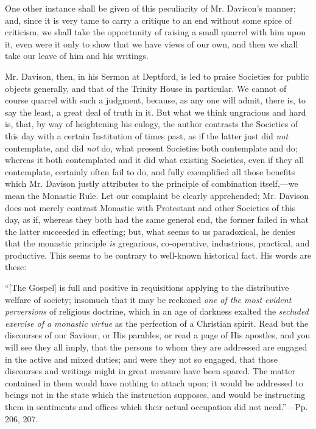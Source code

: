 One other instance shall be given of this
peculiarity of Mr. Davison's manner; and, since it is very tame to
carry a critique to an end without some spice of criticism, we shall
take the opportunity of raising a small quarrel with him upon it, even
were it only to show that we have views of our own, and then we shall
take our leave of him and his writings.

Mr. Davison, then, in his Sermon at Deptford, is
led to praise Societies for public objects generally, and that of the Trinity House in particular. We cannot of course quarrel with
such a judgment, because, as any one will admit, there is, to say the
least, a great deal of truth in it. But what we think ungracious and
hard is, that, by way of heightening his eulogy, the author contrasts
the Societies of this day with a certain Institution of times past, as
if the latter just did \emph{not} contemplate, and did \emph{not} do,
what present Societies both contemplate and do; whereas it both
contemplated and it did what existing Societies, even if they all
contemplate, certainly often fail to do, and fully exemplified all
those benefits which Mr. Davison justly attributes to the principle of
combination itself,—we mean the Monastic Rule. Let our complaint be
clearly apprehended; Mr. Davison does not merely contrast Monastic
with Protestant and other Societies of this day, as if, whereas they
both had the same general end, the former failed in what the latter
succeeded in effecting; but, what seems to us paradoxical, he denies
that the monastic principle \emph{is} gregarious, co-operative,
industrious, practical, and productive. This seems to be contrary to
well-known historical fact. His words are these:

``[The
Gospel] is full and positive in requisitions applying to the
distributive welfare of society; insomuch that it may be reckoned \emph{one
of the most evident perversions} of religious doctrine, which in an
age of darkness exalted the \emph{secluded exercise of a monastic virtue}
as the perfection of a Christian spirit. Read but the discourses of
our Saviour, or His parables, or read a page of His apostles, and you
will see they all imply, that the persons to whom they are addressed
are engaged in the active and mixed duties; and were they not so
engaged, that those discourses and writings might in great measure
have been spared. The matter contained in them would have nothing to
attach upon; it would be addressed to beings not in the state which
the instruction supposes, and would be instructing them in sentiments
and offices which their actual occupation did not need.''—Pp. 206,
207.

